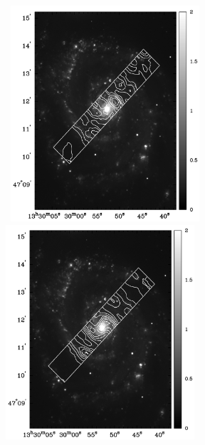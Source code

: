 \documentclass[manuscript]{aastex}
\begin{document}
\clearpage

\begin{figure}[!h]
\centerline{\hbox{ \hspace{0.0in} 
\includegraphics[width=7cm,angle=0]{bw_h2s0_ha.jpg}
\hspace{0.1in}
\includegraphics[width=7cm,angle=0]{bw_h2s1_ha.jpg}}}
\end{figure}
\end{document}

